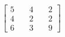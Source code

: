 \documentclass[preview]{standalone}
\begin{document}
\begin{align*}
\begin{bmatrix} 5 & \quad 4 & \quad 2 \\ 4 & \quad 2 & \quad 2 \\ 6 & \quad 3 & \quad 9 \end{bmatrix}
\end{align*}
\end{document}

